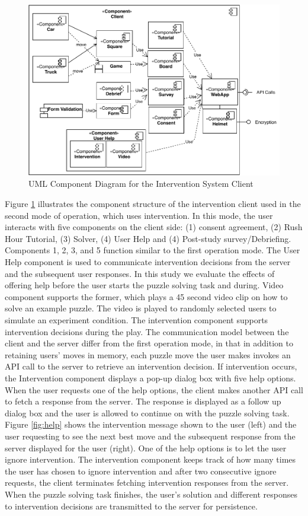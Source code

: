 \begin{figure}[!hbt]
  \centering
\includegraphics[width=\columnwidth]{img/componentclient.pdf}
  \caption{UML Component Diagram for the Intervention System Client}
  \label{fig:compclient}
\end{figure}

Figure \ref{fig:compclient} illustrates the component structure of the intervention client used in the second mode of operation, which uses intervention. In this mode, the user interacts with five components on the client side: (1) consent agreement, (2) Rush Hour Tutorial, (3) Solver, (4) User Help and (4) Post-study survey/Debriefing. Components 1, 2, 3, and 5 function similar to the first operation mode. The User Help component is used to communicate intervention decisions from the server and the subsequent user responses. In this study we evaluate the effects of offering help before the user starts the puzzle solving task and during. Video component supports the former, which plays a 45 second video clip on how to solve an example puzzle. The video is played to randomly selected users to simulate an experiment condition. The intervention component supports intervention decisions during the play. The communication model between the client and the server differ from the first operation mode, in that in addition to retaining users' moves in memory, each puzzle move the user makes invokes an API call to the server to retrieve an intervention decision. If intervention occurs, the Intervention component displays a pop-up dialog box with five help options. When the user requests one of the help options, the client makes another API call to fetch a response from the server. The response is displayed as a follow up dialog box and the user is allowed to continue on with the puzzle solving task. Figure \ref{fig:help} shows the intervention message shown to the user (left) and  the user requesting to see the next best move and the subsequent response from the server displayed for the user (right). One of the help options is to let the user ignore intervention. The intervention component keeps track of how many times the user has chosen to ignore intervention and after two consecutive ignore requests, the client terminates fetching intervention responses from the server. When the puzzle solving task finishes, the user's solution and different responses to intervention decisions are transmitted to the server for persistence.

